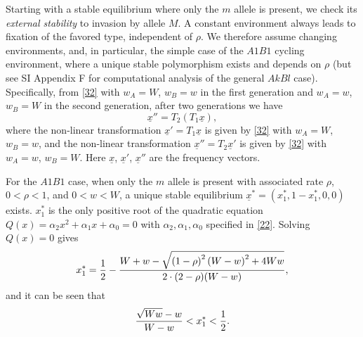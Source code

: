 \documentclass[9pt,twocolumn,twoside,lineno]{pnas-new}
\begin{document}
Starting with a stable equilibrium where only the $m$ allele is present, we check its {\sl external stability} \cite{feldman1986evolutionary,altenberg2017unified} to invasion by allele $M$.
A constant environment always leads to fixation of the favored type, independent of $\rho$. We therefore assume changing environments, and, in particular, the simple case of the $A1B1$ cycling environment, where a unique stable polymorphism exists and depends on $\rho$ (but see SI Appendix F for computational analysis of the general $AkBl$ case). Specifically, from \eqref{32} with $w_A =W$, $w_B =w$ in the first generation and $w_A=w$, $w_B=W$ in the second generation, after two generations we have
\begin{equation}
\underline x''=T_2(T_1\underline x),
\label{34}\end{equation}
where the non-linear transformation $\underline x'=T_1\underline x$ is given by \eqref{32} with $w_A=W$, $w_B=w$, and the non-linear transformation $\underline x''=T_2\underline x'$ is given by \eqref{32} with $w_A=w$, $w_B=W$. Here $\underline x$, $\underline x'$, $\underline x''$ are the frequency vectors.

For the $A1B1$ case, when only the $m$ allele is present with associated rate $\rho$,  $0<\rho<1$, and $0<w<W$, a unique stable equilibrium $\underline x^* =(x_1^*,1-x_1^*,0,0)$ exists. $x_1^*$ is the only positive root of the quadratic equation $Q(x) =\alpha_2x^2 +\alpha_1x +\alpha_0=0$ with $\alpha_2,\alpha_1,\alpha_0$ specified in \eqref{22}. Solving $Q(x)=0$ gives
\begin{equation}
x_1^* ={1\over 2} -{W+w-\sqrt{\left(1-\rho\right)^2\left(W-w\right)^2 +4Ww}\over 2\cdot(2-\rho)(W-w)},
\label{35}\end{equation}
 and it can be seen that
 \begin{equation}
 {\sqrt{Ww}-w\over W-w}<x_1^* <{1\over 2}.
 \label{36}\end{equation}
 
\end{document}
